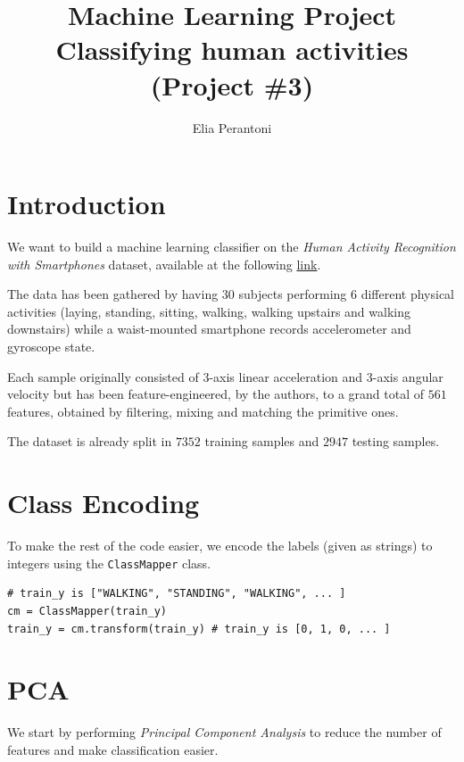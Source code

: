 \documentclass[14pt]{extarticle}
\begin{document}
    \author{Elia Perantoni}
    \title{ Machine Learning Project \\
        \large Classifying human activities \\
        (Project \#3) }
    \maketitle

    \section{Introduction}
    We want to build a machine learning classifier on the \emph{Human Activity
    Recognition with Smartphones} dataset, available at the following
    \href{https://www.kaggle.com/datasets/uciml/human-activity-recognition-with-smartphones}{link}.

    The data has been gathered by having $30$ subjects performing $6$ different
    physical activities (laying, standing, sitting, walking, walking upstairs
    and walking downstairs) while a waist-mounted smartphone records
    accelerometer and gyroscope state.

    Each sample originally consisted of $3$-axis linear acceleration and
    $3$-axis angular velocity but has been feature-engineered, by the authors,
    to a grand total of $561$ features, obtained by filtering, mixing and
    matching the primitive ones.

    The dataset is already split in $7352$ training samples and $2947$ testing
    samples.

    \section{Class Encoding}
    To make the rest of the code easier, we encode the labels (given as strings)
    to integers using the \texttt{ClassMapper} class.

    \begin{verbatim}
# train_y is ["WALKING", "STANDING", "WALKING", ... ]
cm = ClassMapper(train_y)
train_y = cm.transform(train_y) # train_y is [0, 1, 0, ... ]
    \end{verbatim}

    \section{PCA}
    We start by performing \emph{Principal Component Analysis} to reduce the
    number of features and make classification easier.
\end{document}
